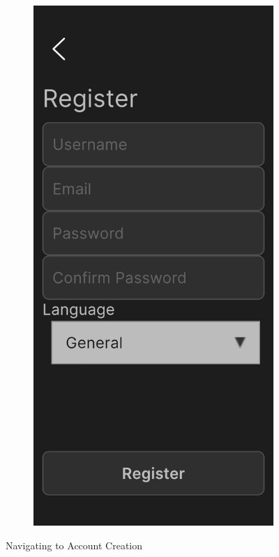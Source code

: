\documentclass[12pt, titlepage]{article}
\begin{document}
\begin{figure}[ht!]
\begin{subfigure}[b]{0.48\textwidth}
    \end{subfigure}
    \hfill
    \begin{subfigure}[b]{0.48\textwidth}
        \centering
        \includegraphics[width=\textwidth]{register1.png}
    \end{subfigure}
    \caption{Navigating to Account Creation}
    \label{fig:setup1}
\end{figure}
\end{document}

